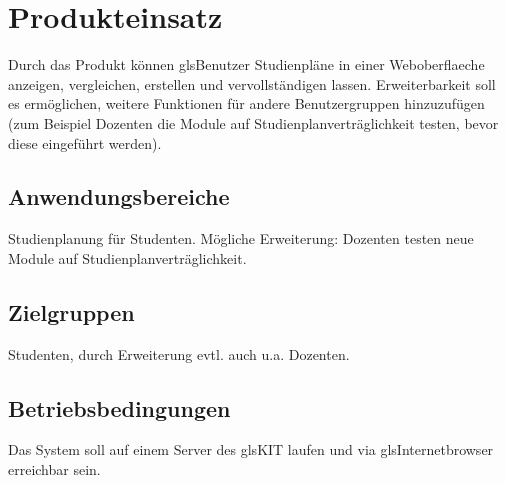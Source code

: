 \section{Produkteinsatz}
Durch das Produkt können gls{Benutzer} Studienpläne in einer \gls{Weboberflaeche} anzeigen, vergleichen, erstellen und vervollständigen lassen. Erweiterbarkeit soll es ermöglichen, weitere Funktionen für andere Benutzergruppen hinzuzufügen (zum Beispiel Dozenten die Module auf Studienplanverträglichkeit testen, bevor diese eingeführt werden). 

\subsection{Anwendungsbereiche}
Studienplanung für Studenten. Mögliche Erweiterung: Dozenten testen neue Module auf Studienplanverträglichkeit.

\subsection{Zielgruppen}
Studenten, durch Erweiterung evtl. auch u.a. Dozenten.
\subsection{Betriebsbedingungen}
Das System soll auf einem Server des gls{KIT} laufen und via gls{Internetbrowser} erreichbar sein.